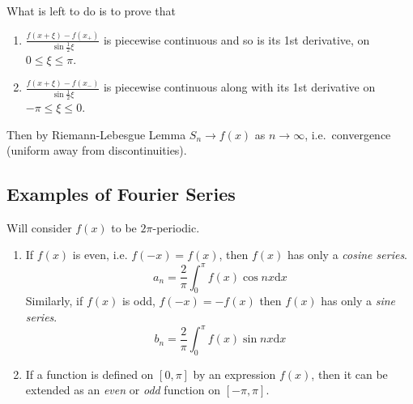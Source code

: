 \documentclass[12pt]{report}
\theoremstyle{definition}
\begin{document}
What is left to do is to prove that 
\begin{enumerate}[label = (\roman*)]
    \item $\frac{f(x + \xi) - f(x_+)}{\sin{\frac{1}{2} \xi}}$ is piecewise continuous and so is its 1st derivative,
        on $0 \le \xi \le \pi$.
    \item $\frac{f(x+\xi) - f(x_-)}{\sin{\frac{1}{2} \xi}}$ is piecewise continuous along with its 1st derivative on
        $-\pi \le \xi \le 0$.
\end{enumerate}
Then by Riemann-Lebesgue Lemma $S_n \rightarrow f(x)$ as $n \rightarrow \infty$, i.e.\ convergence 
(uniform away from discontinuities).

\subsection{Examples of Fourier Series}
Will consider $f(x)$ to be $2\pi$-periodic.
\begin{enumerate}[label = (\roman*)]
    \item If $f(x)$ is even, i.e. $f(-x) = f(x)$, then $f(x)$ has only a \emph{cosine series}.\[
            a_n = \frac{2}{\pi}\int_{0}^{\pi} f(x) \cos{nx} \mathrm{d}x
    \]
    Similarly, if $f(x)$ is odd, $f(-x) = -f(x)$ then $f(x)$ has only a \emph{sine series}. \[
        b_n = \frac{2}{\pi} \int_{0}^{\pi} f(x) \sin{nx} \mathrm{d}x
    \]
\item If a function is defined on $[0,\pi]$ by an expression $f(x)$, then it can be extended as an \emph{even}
    or \emph{odd} function on $[-\pi,\pi]$.
\end{enumerate}
\end{document}
